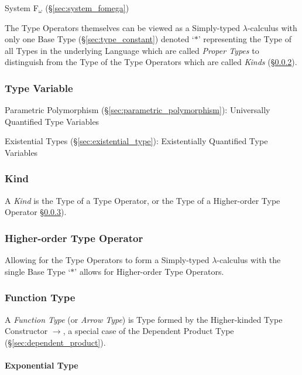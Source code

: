 System F$_{\omega}$ (\S\ref{sec:system_fomega})

The Type Operators themselves can be viewed as a Simply-typed
$\lambda$-calculus with only one Base Type (\S\ref{sec:type_constant})
denoted `$\ast$' representing the Type of all Types in the underlying
Language which are called \emph{Proper Types} to distinguish from the
Type of the Type Operators which are called \emph{Kinds}
(\S\ref{sec:kind}).



\subsubsection{Type Variable}\label{sec:type_variable}

Parametric Polymorphism (\S\ref{sec:parametric_polymorphism}):
Universally Quantified Type Variables

Existential Types (\S\ref{sec:existential_type}):
Existentially Quantified Type Variables



\subsubsection{Kind}\label{sec:kind}

A \emph{Kind} is the Type of a Type Operator, or the Type of a
Higher-order Type Operator \S\ref{sec:higherorder_typeoperator}).



\subsubsection{Higher-order Type Operator}
\label{sec:higherorder_typeoperator}

Allowing for the Type Operators to form a Simply-typed
$\lambda$-calculus with the single Base Type `$*$' allows for
Higher-order Type Operators.



\subsubsection{Function Type}\label{sec:function_type}

A \emph{Function Type} (or \emph{Arrow Type}) is Type formed by the
Higher-kinded Type Constructor $\rightarrow$, a special case of the
Dependent Product Type (\S\ref{sec:dependent_product}).



\paragraph{Exponential Type}\label{sec:exponential_type}
\hfill \\

